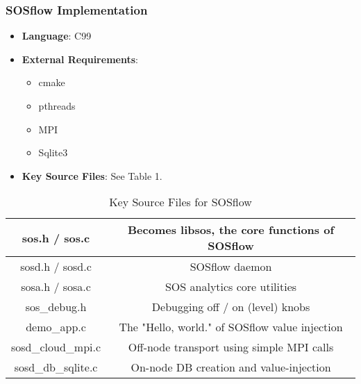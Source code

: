 \subsubsection{SOSflow Implementation}
\begin{itemize}
  \item \textbf{Language}: C99
   \item \textbf{External Requirements}:
   \begin{itemize}
    \item cmake
    \item pthreads
    \item MPI
    \item Sqlite3
    \end{itemize}
  \item \textbf{Key Source Files}: See Table 1.
\end{itemize}

\begin{table}[!t]
\renewcommand{\arraystretch}{1.3}
\caption{Key Source Files for SOSflow}
\label{tableexample}
\centering
\begin{tabular}{|c|c|}
\hline %
sos.h / sos.c & Becomes libsos, the core functions of SOSflow\\
\hline %
sosd.h / sosd.c & SOSflow daemon\\
\hline %
sosa.h / sosa.c & SOS analytics core utilities\\
\hline %
sos\_debug.h & Debugging off / on (level) knobs\\
\hline %
demo\_app.c & The "Hello, world." of SOSflow value injection\\
\hline %
sosd\_cloud\_mpi.c & Off-node transport using simple MPI calls\\
\hline %
sosd\_db\_sqlite.c & On-node DB creation and value-injection\\
\hline %
\end{tabular}
\end{table}


